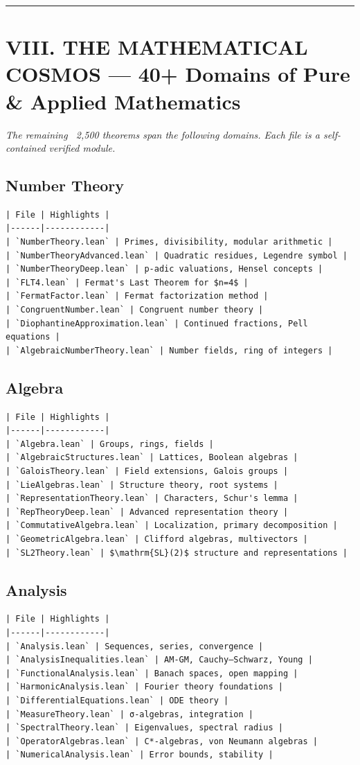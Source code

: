 \documentclass[12pt,a4paper,openany]{book}
\begin{document}
\bigskip\hrule\bigskip

\section{VIII. THE MATHEMATICAL COSMOS — 40+ Domains of Pure \& Applied Mathematics}

\textit{The remaining ~2,500 theorems span the following domains. Each file is a self-contained verified module.}

\subsection{Number Theory}
\begin{verbatim}
| File | Highlights |
|------|------------|
| `NumberTheory.lean` | Primes, divisibility, modular arithmetic |
| `NumberTheoryAdvanced.lean` | Quadratic residues, Legendre symbol |
| `NumberTheoryDeep.lean` | p-adic valuations, Hensel concepts |
| `FLT4.lean` | Fermat's Last Theorem for $n=4$ |
| `FermatFactor.lean` | Fermat factorization method |
| `CongruentNumber.lean` | Congruent number theory |
| `DiophantineApproximation.lean` | Continued fractions, Pell equations |
| `AlgebraicNumberTheory.lean` | Number fields, ring of integers |
\end{verbatim}

\subsection{Algebra}
\begin{verbatim}
| File | Highlights |
|------|------------|
| `Algebra.lean` | Groups, rings, fields |
| `AlgebraicStructures.lean` | Lattices, Boolean algebras |
| `GaloisTheory.lean` | Field extensions, Galois groups |
| `LieAlgebras.lean` | Structure theory, root systems |
| `RepresentationTheory.lean` | Characters, Schur's lemma |
| `RepTheoryDeep.lean` | Advanced representation theory |
| `CommutativeAlgebra.lean` | Localization, primary decomposition |
| `GeometricAlgebra.lean` | Clifford algebras, multivectors |
| `SL2Theory.lean` | $\mathrm{SL}(2)$ structure and representations |
\end{verbatim}

\subsection{Analysis}
\begin{verbatim}
| File | Highlights |
|------|------------|
| `Analysis.lean` | Sequences, series, convergence |
| `AnalysisInequalities.lean` | AM-GM, Cauchy–Schwarz, Young |
| `FunctionalAnalysis.lean` | Banach spaces, open mapping |
| `HarmonicAnalysis.lean` | Fourier theory foundations |
| `DifferentialEquations.lean` | ODE theory |
| `MeasureTheory.lean` | σ-algebras, integration |
| `SpectralTheory.lean` | Eigenvalues, spectral radius |
| `OperatorAlgebras.lean` | C*-algebras, von Neumann algebras |
| `NumericalAnalysis.lean` | Error bounds, stability |
\end{verbatim}
\end{document}
